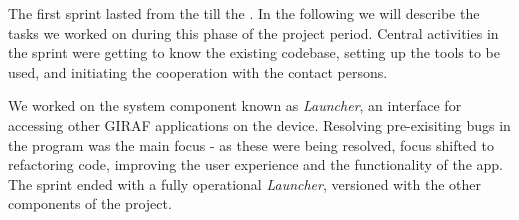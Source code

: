 The first sprint lasted from the  till the .
In the following we will describe the tasks we worked on during this phase of the project period. 
Central activities in the sprint were getting to know the existing codebase, setting up the tools to be used, and initiating the cooperation with the contact persons.

We worked on the system component known as \textit{Launcher}, an interface for accessing other GIRAF applications on the device.
Resolving pre-exisiting bugs in the program was the main focus - as these were being resolved, focus shifted to refactoring code, improving the user experience and the functionality of the app.
The sprint ended with a fully operational \textit{Launcher}, versioned with the other components of the project.